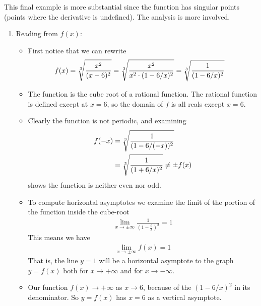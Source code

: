 This final example is more substantial since the function has singular points
(points where the derivative is undefined). The analysis is more involved.
\begin{eg}[$f(x)=\root{3}\of{\frac{x^2}{(x-6)^2}}\ $]\label{APPsketchC}
\begin{enumerate}[(1)]
\item Reading from $f(x)$:
\begin{itemize}
\item First notice that we can rewrite
\begin{align*}
  f(x) &= \root{3}\of{\frac{x^2}{(x-6)^2}}
  = \root{3}\of{\frac{x^2}{x^2\cdot(1-6/x)^2}}
  = \root{3}\of{\frac{1}{(1-6/x)^2}}
\end{align*}
 \item The function is the cube root of a rational function. The rational
function is defined except at $x=6$, so the domain of $f$ is all reals except
$x=6$.
 \item Clearly the function is not periodic, and examining
\begin{align*}
  f(-x) &= \root{3}\of{\frac{ 1}{(1-6/(-x))^2}} \\
  &= \root{3}\of{\frac{1}{(1+6/x)^2}} \neq \pm f(x)
\end{align*}
shows the function is neither even nor odd.
\item To compute horizontal asymptotes we examine the limit of the portion of
the function inside the cube-root
\begin{align*}
\lim_{x\rightarrow\pm\infty} \frac{1}{(1-\frac{6}{x})^2}
=1
\end{align*}
This means we have
\begin{align*}
\lim_{x\rightarrow\pm\infty} f(x)=1
\end{align*}
That is, the line $y=1$ will be a horizontal asymptote to the graph $y=f(x)$
both for $x\rightarrow+\infty$ and for $x\rightarrow-\infty$.

\item Our function $f(x)\rightarrow+\infty$ as $x\rightarrow 6$, because of
the $(1-6/x)^2$ in its denominator. So $y=f(x)$ has $x=6$ as a vertical
asymptote.
\end{itemize}



\end{enumerate}
\end{eg}
